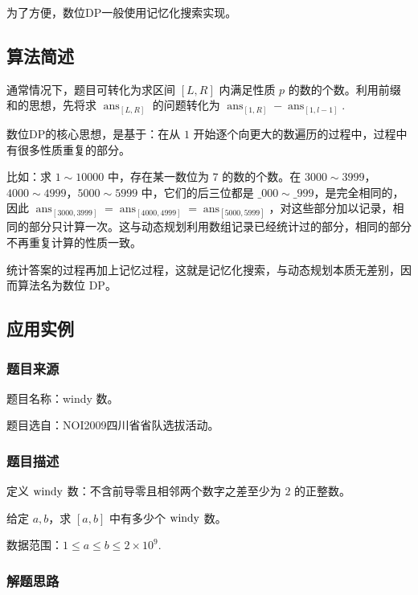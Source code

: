 为了方便，数位DP一般使用记忆化搜索实现。

\subsection{算法简述}

通常情况下，题目可转化为求区间 \([L, R]\) 内满足性质 \(p\)
的数的个数。利用前缀和的思想，先将求 \(\operatorname{ans}_{[L,R]}\)
的问题转化为
\(\operatorname{ans}_{[1,R]}-\operatorname{ans}_{[1,l-1]}\).

数位DP的核心思想，是基于：在从 \(1\)
开始逐个向更大的数遍历的过程中，过程中有很多性质重复的部分。

比如：求 \(1\sim 10000\) 中，存在某一数位为 \(7\) 的数的个数。在
\(3000\sim3999\)，\(4000\sim4999\)，\(5000\sim 5999\)
中，它们的后三位都是 \(\_000\sim \_ 999\)，是完全相同的，因此
\(\operatorname{ans}_{[3000,3999]}=\operatorname{ans}_{[4000,4999]}=\operatorname{ans}_{[5000,5999]}\)，对这些部分加以记录，相同的部分只计算一次。这与动态规划利用数组记录已经统计过的部分，相同的部分不再重复计算的性质一致。

统计答案的过程再加上记忆过程，这就是记忆化搜索，与动态规划本质无差别，因而算法名为数位
DP。

\subsection{应用实例}

\subsubsection{题目来源}

题目名称：windy 数。

题目选自：NOI2009四川省省队选拔活动。

\subsubsection{题目描述}

定义 \(\rm{windy}\) 数：不含前导零且相邻两个数字之差至少为 \(2\)
的正整数。

给定 \(a,b\)，求 \([a,b]\) 中有多少个 \(\rm{windy}\) 数。

数据范围：\(1\leq a\leq b\leq 2\times 10^9\).

\subsubsection{解题思路}

